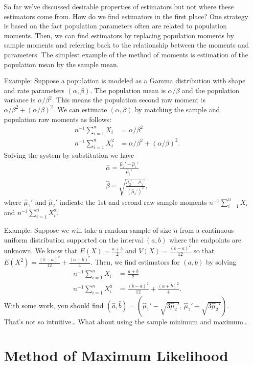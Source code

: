 \documentclass[
]{book}
\begin{document}
So far we've discussed desirable properties of estimators but not where these estimators come from. How do we find estimators in the first place? One strategy is based on the fact population parameters often are related to population moments. Then, we can find estimators by replacing population moments by sample moments and referring back to the relationship between the moments and parameters. The simplest example of the method of moments is estimation of the population mean by the sample mean.

Example: Suppose a population is modeled as a Gamma distribution with shape and rate parameters \((\alpha, \beta)\). The population mean is \(\alpha / \beta\) and the population variance is \(\alpha / \beta^2\). This means the population second raw moment is \(\alpha / \beta^2 + (\alpha / \beta)^2\). We can estimate \((\alpha, \beta)\) by matching the sample and population raw moments as follows:
\begin{align*}
n^{-1}\sum_{i=1}^n X_i &= \alpha/\beta^2\\
n^{-1}\sum_{i=1}^n X_i^2 &= \alpha/\beta^2 + (\alpha / \beta)^2.
\end{align*}
Solving the system by substitution we have
\begin{align*}
\hat\alpha = \frac{\hat\mu_2' - \hat\mu_1'}{\hat\mu_1'}\\
\hat \beta = \sqrt{\frac{\hat\mu_2' - \hat\mu_1'}{(\hat\mu_1')^2}},
\end{align*}
where \(\hat\mu_1'\) and \(\hat\mu_2'\) indicate the 1st and second raw sample moments \(n^{-1}\sum_{i=1}^n X_i\) and \(n^{-1}\sum_{i=1}^n X_i^2\).

Example: Suppose we will take a random sample of size \(n\) from a continuous uniform distribution supported on the interval \((a,b)\) where the endpoints are unknown. We know that \(E(X) = \frac{a+b}{2}\) and \(V(X) = \frac{(b-a)^2}{12}\) so that \(E(X^2) = \frac{(b-a)^2}{12} + \frac{(a+b)^2}{4}\). Then, we find estimators for \((a,b)\) by solving
\begin{align*}
n^{-1}\sum_{i=1}^n X_i &= \frac{a+b}{2}\\
n^{-1}\sum_{i=1}^n X_i^2 &= \frac{(b-a)^2}{12} + \frac{(a+b)^2}{4}.
\end{align*}
With some work, you should find \((\hat a, \hat b) = (\hat\mu_1' - \sqrt{3\hat\mu_2'}, \, \hat\mu_1'+\sqrt{3\hat\mu_2'})\). That's not so intuitive\ldots{} What about using the sample minimum and maximum\ldots{}

\hypertarget{method-of-maximum-likelihood}{%
\section{Method of Maximum Likelihood}\label{method-of-maximum-likelihood}}
\end{document}
